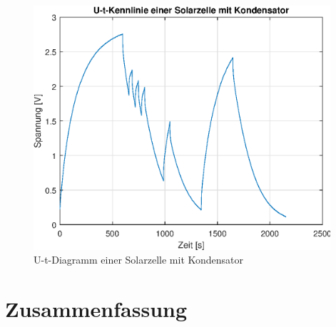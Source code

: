 \begin{figure}[htb]
\centering
\includegraphics[width=11cm]{pictures/Vergleich/mit-Kondensator.eps}
\caption{U-t-Diagramm einer Solarzelle mit Kondensator}
\label{fig:mit-Kondensator}
\end{figure}

\clearpage
\section{Zusammenfassung}

